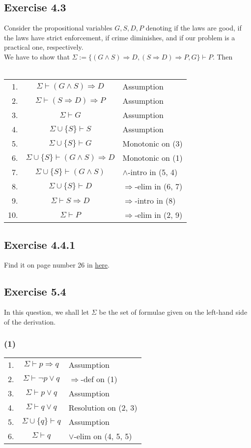 \documentclass{article}
\begin{document}
\subsection*{Exercise 4.3}
Consider the propositional variables $G, S, D, P$ denoting if the laws are good, if the laws have strict enforcement, if crime diminishes, and if our problem is a practical one, respectively.\\
We have to show that $\Sigma := \{(G\wedge S)\Rightarrow D, (S\Rightarrow D)\Rightarrow P, G\}\vdash P$. Then \\
\\
\begin{tabular}{r c l}
    1. & $\Sigma\vdash (G\wedge S)\Rightarrow D$ & Assumption\\
    2. & $\Sigma\vdash (S\Rightarrow D)\Rightarrow P$ & Assumption\\
    3. & $\Sigma\vdash G$ & Assumption\\
    4. & $\Sigma\cup\{S\}\vdash S$ & Assumption\\
    5. & $\Sigma\cup\{S\}\vdash G$ & Monotonic on (3)\\
    6. & $\Sigma\cup\{S\}\vdash (G\wedge S)\Rightarrow D$ & Monotonic on (1)\\
    7. & $\Sigma\cup\{S\}\vdash (G\wedge S)$ & $\wedge$-intro in (5, 4)\\
    8. & $\Sigma\cup\{S\}\vdash D$ & $\Rightarrow$-elim in (6, 7)\\
    9. & $\Sigma\vdash S\Rightarrow D$ & $\Rightarrow$-intro in (8)\\
    10. & $\Sigma\vdash P$ & $\Rightarrow$-elim in (2, 9)\\
\end{tabular}
\subsection*{Exercise 4.4.1}
Find it on page number 26 in \href{https://www.cse.iitb.ac.in/~akg/courses/2022-logic/lec-04-formal.pdf}{here}.
\subsection*{Exercise 5.4} 
In this question, we shall let $\Sigma$ be the set of formulae given on the left-hand side of the derivation. 
\subsubsection*{(1)}
\begin{tabular}{r c l}
    1. & $\Sigma\vdash p\Rightarrow q$ & Assumption\\
    2. & $\Sigma\vdash \lnot p\lor q$ & $\Rightarrow$-def on (1)\\
    3. & $\Sigma\vdash p\lor q$ & Assumption\\
    4. & $\Sigma\vdash q\lor q$ & Resolution on (2, 3)\\
    5. & $\Sigma\cup\{q\}\vdash q$ & Assumption\\
    6. & $\Sigma\vdash q$ & $\lor$-elim on (4, 5, 5)\\
\end{tabular}
\end{document}
